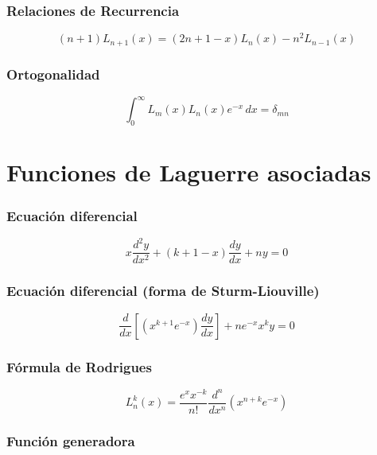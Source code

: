 \subsubsection{Relaciones de Recurrencia}

\begin{equation}
(n+1)L_{n+1}(x)=(2n+1-x)L_{n}(x)-n^{2}L_{n-1}(x)
\end{equation}

\subsubsection{Ortogonalidad}

\begin{equation}
\int_{0}^{\infty}L_{m}(x)L_{n}(x)e^{-x}\,dx=\delta_{mn}
\end{equation}

\newpage
\section{Funciones de Laguerre asociadas}

\subsubsection{Ecuación diferencial}

\begin{equation}
x\frac{d^{2}y}{dx^{2}}+(k+1-x)\frac{dy}{dx}+ny=0
\end{equation}

\subsubsection{Ecuación diferencial (forma de Sturm-Liouville)}

\begin{equation}
\frac{d}{dx}\left[\left(x^{k+1}e^{-x} \right)\frac{dy}{dx}\right]+ne^{-x}x^{k}y=0
\end{equation}

\subsubsection{Fórmula de Rodrigues}

\begin{equation}
L_{n}^{k}(x)=\frac{e^{x}x^{-k}}{n!}\frac{d^{n}}{dx^{n}}(x^{n+k}e^{-x})
\end{equation}

\subsubsection{Función generadora}

